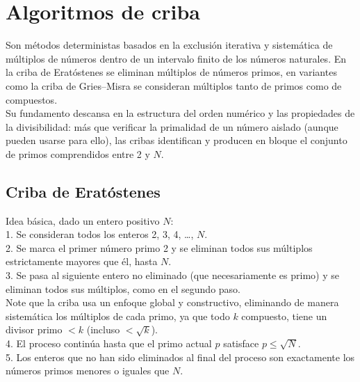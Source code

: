 \section{Algoritmos de criba}
Son métodos deterministas basados en la exclusión iterativa y sistemática de múltiplos de números dentro de un  intervalo finito de los números naturales. En la criba de Eratóstenes se eliminan múltiplos de números primos, en variantes como la criba de Gries–Misra se consideran múltiplos tanto de primos como de compuestos. \\
Su fundamento descansa en la estructura del orden numérico y las propiedades de la divisibilidad: más que verificar la primalidad de un número aislado (aunque pueden usarse para ello), las cribas identifican y producen en bloque el conjunto de primos comprendidos entre 2 y $N$.

\subsection{Criba de Eratóstenes}
\label{subsec:Eratostenes}
Idea básica, dado un entero positivo $N$: \\ 
1. Se consideran todos los enteros 2, 3, 4, \dots, $N$. \\
2. Se marca el primer número primo 2 y se eliminan todos sus múltiplos estrictamente mayores que él, hasta $N$. \\  
3. Se pasa al siguiente entero no eliminado (que necesariamente es primo) y se eliminan todos sus múltiplos, como en el segundo paso. \\
Note que la criba usa un enfoque global y constructivo, eliminando de manera sistemática los múltiplos de cada primo, ya que todo $k$ compuesto, tiene un divisor primo $< k$ (incluso $< \sqrt{k}$).
\\  
4. El proceso continúa hasta que el primo actual $p$ satisface $p \leq \sqrt{N}$. \\  
5. Los enteros que no han sido eliminados al final del proceso son exactamente los números primos menores o iguales que $N$. 

